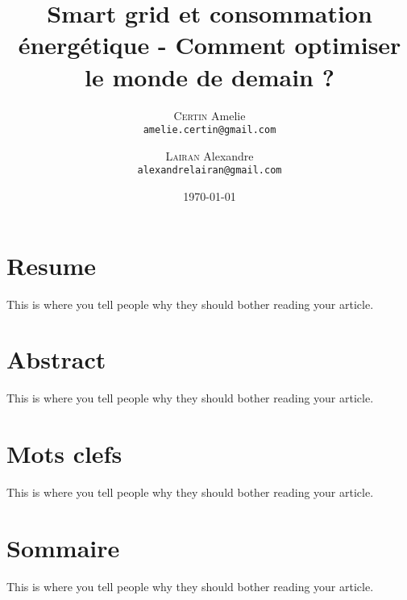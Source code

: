 \documentclass[11pt,french]{report}
\title{Smart grid et consommation énergétique - Comment optimiser le monde de demain ?}
\author{
  \textsc{Certin} Amelie\\
  \texttt{amelie.certin@gmail.com}
  \and
  \textsc{Lairan} Alexandre\\
  \texttt{alexandrelairan@gmail.com}
}
\date{\today}
\begin{document}
  \maketitle

  \chapter{Resume}
  This is where you tell people why they should bother reading your article.

  \chapter{Abstract}
  This is where you tell people why they should bother reading your article.

  \chapter{Mots clefs}
  This is where you tell people why they should bother reading your article.

  \chapter{Sommaire}
  This is where you tell people why they should bother reading your article.

  
\end{document}
